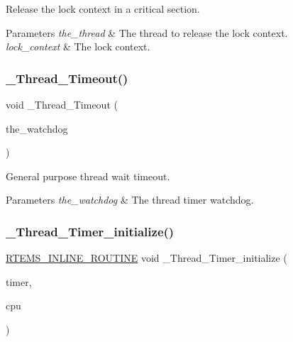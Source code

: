 Release the lock context in a critical section. 


\begin{DoxyParams}{Parameters}
{\em the\+\_\+thread} & The thread to release the lock context. \\
\hline
{\em lock\+\_\+context} & The lock context. \\
\hline
\end{DoxyParams}
\mbox{\label{group__RTEMSScoreThread_ga1870eabe77ae0e3913b3888fe4c47185}} 
\subsubsection{\texorpdfstring{\_Thread\_Timeout()}{\_Thread\_Timeout()}}
{\footnotesize\ttfamily void \+\_\+\+Thread\+\_\+\+Timeout (\begin{DoxyParamCaption}\item[{\mbox{\hyperlink{structWatchdog__Control}{Watchdog\+\_\+\+Control}} $\ast$}]{the\+\_\+watchdog }\end{DoxyParamCaption})}



General purpose thread wait timeout. 


\begin{DoxyParams}{Parameters}
{\em the\+\_\+watchdog} & The thread timer watchdog. \\
\hline
\end{DoxyParams}
\mbox{\label{group__RTEMSScoreThread_gacb988363d243a9c060fdeb9a2cf3d401}} 
\subsubsection{\texorpdfstring{\_Thread\_Timer\_initialize()}{\_Thread\_Timer\_initialize()}}
{\footnotesize\ttfamily \mbox{\hyperlink{group__RTEMSScoreBaseDefs_gac216239df231d5dbd15e3520b0b9313f}{R\+T\+E\+M\+S\+\_\+\+I\+N\+L\+I\+N\+E\+\_\+\+R\+O\+U\+T\+I\+NE}} void \+\_\+\+Thread\+\_\+\+Timer\+\_\+initialize (\begin{DoxyParamCaption}\item[{\mbox{\hyperlink{structThread__Timer__information}{Thread\+\_\+\+Timer\+\_\+information}} $\ast$}]{timer,  }\item[{\mbox{\hyperlink{structPer__CPU__Control}{Per\+\_\+\+C\+P\+U\+\_\+\+Control}} $\ast$}]{cpu }\end{DoxyParamCaption})}



